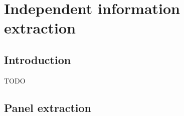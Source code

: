 \chapter{Independent information extraction}
\label{chap:independent}
\graphicspath{{./chapters/4-independent/figs/}}

\section{Introduction}
\label{sec:in:intro}

TODO


\section{Panel extraction}
\label{sec:in:panel}


